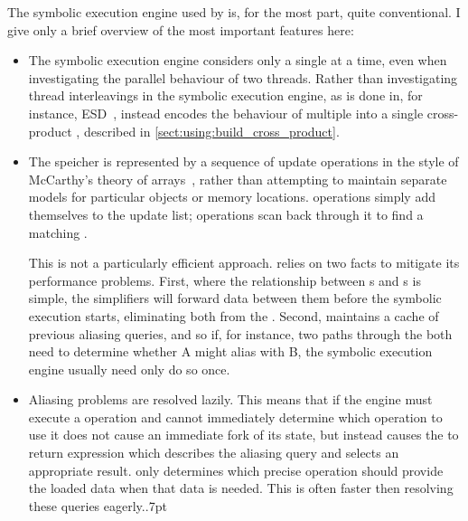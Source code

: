 The symbolic execution engine used by {\implementation} is, for the
most part, quite conventional.  I give only a brief overview of the
most important features here:
\begin{itemize}
\item The symbolic execution engine considers only a single
  {\StateMachine} at a time, even when investigating the parallel
  behaviour of two threads.  Rather than investigating thread
  interleavings in the symbolic execution engine, as is done in, for
  instance, ESD~\cite{Zamfir2010}, {\technique} instead encodes the
  behaviour of multiple {\StateMachines} into a single cross-product
  {\StateMachines}, described in
  \autoref{sect:using:build_cross_product}.

\item The {\StateMachine} speicher is represented by a sequence of
  update operations in the style of McCarthy's theory of
  arrays~\cite{McCarthy1962}, rather than attempting to maintain
  separate models for particular objects or memory locations.
   operations simply add themselves to the update list;
   operations scan back through it to find a matching
  .

  This is not a particularly efficient approach.  {\Implementation}
  relies on two facts to mitigate its performance problems.  First,
  where the relationship between s and s is
  simple, the {\StateMachine} simplifiers will forward data between
  them before the symbolic execution starts, eliminating both from the
  {\StateMachine}.  Second, {\implementation} maintains a cache of
  previous aliasing queries, and so if, for instance, two paths
  through the {\StateMachine} both need to determine whether
   A might alias with  B, the symbolic
  execution engine usually need only do so once.

\item Aliasing problems are resolved lazily.  This means that if the
  engine must execute a  operation and cannot immediately
  determine which  operation to use it does not cause an
  immediate fork of its state, but instead causes the  to
  return {\AStateMachine} expression which describes the aliasing
  query and selects an appropriate result.  {\Implementation} only
  determines which precise  operation should provide the
  loaded data when that data is needed.  This is often faster then
  resolving these queries eagerly.\kern.7pt


\end{itemize}
